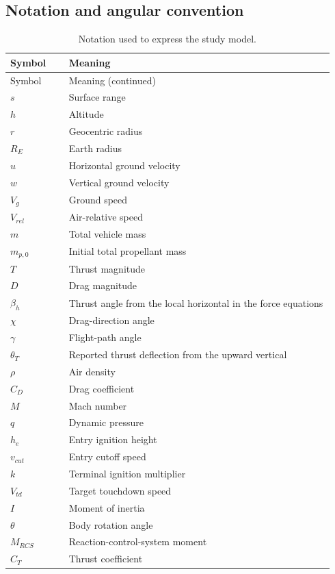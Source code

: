 \documentclass[11pt,a4paper]{article}
\begin{document}
\subsection{Notation and angular convention}
\begingroup
\small
\begin{longtable}{@{}p{0.17\linewidth}p{0.77\linewidth}@{}}
\caption{Notation used to express the study model.}\label{tab:notation}\\
\toprule Symbol & Meaning\\ \midrule
\endfirsthead
\toprule Symbol & Meaning (continued)\\ \midrule
\endhead
\bottomrule\endfoot
$s$ & Surface range\\
$h$ & Altitude\\
$r$ & Geocentric radius\\
$R_E$ & Earth radius\\
$u$ & Horizontal ground velocity\\
$w$ & Vertical ground velocity\\
$V_g$ & Ground speed\\
$V_{rel}$ & Air-relative speed\\
$m$ & Total vehicle mass\\
$m_{p,0}$ & Initial total propellant mass\\
$T$ & Thrust magnitude\\
$D$ & Drag magnitude\\
$\beta_h$ & Thrust angle from the local horizontal in the force equations\\
$\chi$ & Drag-direction angle\\
$\gamma$ & Flight-path angle\\
$\theta_T$ & Reported thrust deflection from the upward vertical\\
$\rho$ & Air density\\
$C_D$ & Drag coefficient\\
$M$ & Mach number\\
$q$ & Dynamic pressure\\
$h_e$ & Entry ignition height\\
$v_{cut}$ & Entry cutoff speed\\
$k$ & Terminal ignition multiplier\\
$V_{td}$ & Target touchdown speed\\
$I$ & Moment of inertia\\
$\theta$ & Body rotation angle\\
$M_{RCS}$ & Reaction-control-system moment\\
$C_T$ & Thrust coefficient\\
\end{longtable}
\endgroup
\end{document}
